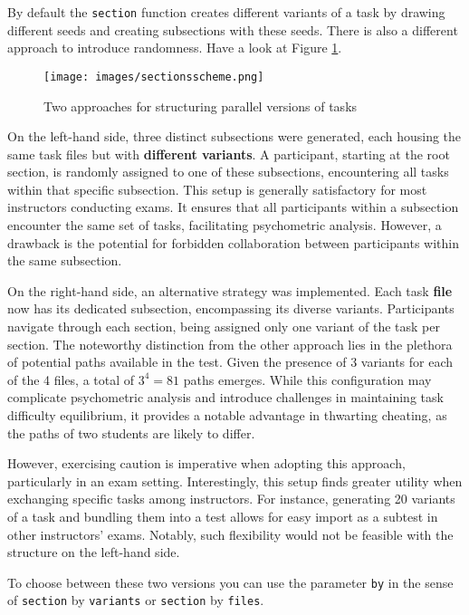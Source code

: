 \documentclass[twoside]{tufte-book}
\begin{document}
By default the \texttt{section} function creates different variants of a task by drawing different seeds and creating subsections with these seeds. There is also a different approach to introduce randomness. Have a look at Figure \ref{scheme}.

\begin{figure}
\centering
\texttt{[image: images/sectionsscheme.png]}
\caption{\label{scheme}Two approaches for structuring parallel versions of tasks}
\end{figure}

On the left-hand side, three distinct subsections were generated, each housing the same task files but with \textbf{different variants}. A participant, starting at the root section, is randomly assigned to one of these subsections, encountering all tasks within that specific subsection. This setup is generally satisfactory for most instructors conducting exams. It ensures that all participants within a subsection encounter the same set of tasks, facilitating psychometric analysis. However, a drawback is the potential for forbidden collaboration between participants within the same subsection.

On the right-hand side, an alternative strategy was implemented. Each task \textbf{file} now has its dedicated subsection, encompassing its diverse variants. Participants navigate through each section, being assigned only one variant of the task per section. The noteworthy distinction from the other approach lies in the plethora of potential paths available in the test. Given the presence of 3 variants for each of the 4 files, a total of \(3^4 = 81\) paths emerges. While this configuration may complicate psychometric analysis and introduce challenges in maintaining task difficulty equilibrium, it provides a notable advantage in thwarting cheating, as the paths of two students are likely to differ.

However, exercising caution is imperative when adopting this approach, particularly in an exam setting. Interestingly, this setup finds greater utility when exchanging specific tasks among instructors. For instance, generating 20 variants of a task and bundling them into a test allows for easy import as a subtest in other instructors' exams. Notably, such flexibility would not be feasible with the structure on the left-hand side.

To choose between these two versions you can use the parameter \texttt{by} in the sense of \texttt{section} by \texttt{variants} or \texttt{section} by \texttt{files}.
\end{document}
